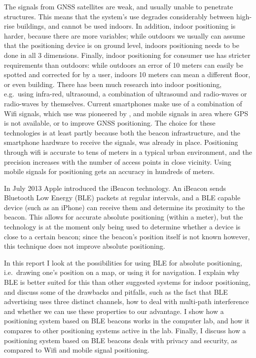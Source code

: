 The signals from GNSS satellites are weak, and usually unable to penetrate structures.
This means that the system's use degrades considerably between high-rise buildings, and cannot be used indoors.
In addition, indoor positioning is harder, because there are more variables; while outdoors we usually can assume that the positioning device is on ground level, indoors positioning needs to be done in all 3 dimensions.
Finally, indoor positioning for consumer use has stricter requirements than outdoors: while outdoors an error of 10 meters can easily be spotted and corrected for by a user, indoors 10 meters can mean a different floor, or even building. 
There has been much research into indoor positioning, e.g.\ using infra-red\citep{want1992active}, ultrasound\citep{harter2002anatomy}, a combination of ultrasound and radio-waves\citep{priyantha2000cricket} or radio-waves by themselves\citep{lorincz2005motetrack}.
Current smartphones make use of a combination of Wifi signals, which use was pioneered by \citet{bahl2000enhancements}, and mobile signals in area where GPS is not available, or to improve GNSS positioning.
The choice for these technologies is at least partly because both the beacon infrastructure, and the smartphone hardware to receive the signals, was already in place.
Positioning through wifi is accurate to tens of meters in a typical urban environment\citep{zandbergen2009accuracy}, and the precision increases with the number of access points in close vicinity.
Using mobile signals for positioning gets an accuracy in hundreds of meters.

In July 2013 Apple introduced the iBeacon technology.
An iBeacon sends Bluetooth Low Energy (BLE) packets at regular intervals, and a BLE capable device (such as an iPhone) can receive them and determine its proximity to the beacon.
This allows for accurate absolute positioning (within a meter), but the technology is at the moment only being used to determine whether a device is close to a certain beacon; since the beacon's position itself is not known however, this technique does not improve absolute positioning.

In this report I look at the possibilities for using BLE for absolute positioning, i.e.\ drawing one's position on a map, or using it for navigation.
I explain why BLE is better suited for this than other suggested systems for indoor positioning, and discuss some of the drawbacks and pitfalls, such as the fact that BLE advertising uses three distinct channels, how to deal with multi-path interference and whether we can use these properties to our advantage.
I show how a positioning system based on BLE beacons works in the computer lab, and how it compares to other positioning systems active in the lab.
Finally, I discuss how a positioning system based on BLE beacons deals with privacy and security, as compared to Wifi and mobile signal positioning.


